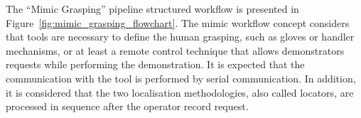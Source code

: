 \begin{figure}[h!]
\end{figure}



The ``Mimic Grasping'' pipeline structured workflow is presented in Figure~\ref{fig:mimic_grasping_flowchart}. The mimic workflow concept considers that tools are necessary to define the human grasping, such as gloves or handler mechanisms, or at least a remote control technique that allows demonstrators requests while performing the demonstration. It is expected that the communication with the tool is performed by serial communication. In addition, it is considered that the two localisation methodologies, also called locators, are processed in sequence after the operator record request. 

